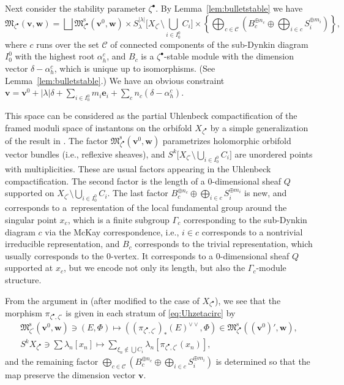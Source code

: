 \documentclass[pdftex]{sigma}
\theoremstyle{definition}
\numberwithin{equation}{section}
\newcommand{\lemref}[1]{Lemma~\ref{#1}}
\newcommand{\M}{{\mathfrak M}} %
\newcommand{\Mreg}{\M^{\operatorname{s}}}
\newcommand{\bv}{{\mathbf v}} %
\newcommand{\bw}{{\mathbf w}} %
\newcommand{\be}{{\mathbf e}}
\begin{document}
Next consider the stability parameter $\zeta^\bullet$. By \lemref{lem:bulletstable} we have
\begin{equation}\label{eq:Uhbullet}
  \M_{\zeta^\bullet}(\bv,\bw)
= \bigsqcup \Mreg_{\zeta^\bullet}(\bv^0,\bw)
  \times S^{|\lambda|}_\lambda
  \Big[X_{\zeta^\circ}\setminus \bigcup_{i\in I_0^0} C_i \Big]
  \times \left\{
    \bigoplus_{c\in\mathcal C} \left(
      B_c^{\oplus n_c} \oplus
    \bigoplus_{i\in c}  S_i^{\oplus m_i} \right)
    \right\},
\end{equation}
where $c$ runs over the set $\mathcal C$ of connected components of
the sub-Dynkin diagram $I_0^0$ with the highest root $\alpha^c_h$, and
$B_c$ is a $\zeta^\bullet$-stable module with the dimension vector
$\delta - \alpha^c_h$, which is unique up to isomorphisms.
(See \lemref{lem:bulletstable}.)
We have an obvious constraint
\(
   \bv = \bv^0 + |\lambda| \delta + \sum_{i\in I_0^0} m_i \be_i
   + \sum_c n_c (\delta - \alpha^c_h).
\)

This space can be considered as the partial Uhlenbeck compactif\/ication
of the framed moduli space of instantons on the orbifold
$X_{\zeta^\bullet}$ by a simple generalization of the result in
\cite{KN}. The factor $\Mreg_{\zeta^\bullet}(\bv^0,\bw)$ parametrizes
holomorphic orbifold vector bundles (i.e., ref\/lexive sheaves), and
$S^k \big[X_{\zeta^\circ}\setminus \bigcup_{i\in I_0^0} C_i\big]$ are
unordered points with multiplicities. These are usual factors
appearing in the Uhlenbeck compactif\/ication. The second factor is the
length of a $0$-dimensional sheaf $Q$ supported on
$X_{\zeta^\circ}\setminus \bigcup_{i\in I_0^0} C_i$.
%
The last factor
\(
    B_c^{\oplus n_c} \oplus
    \bigoplus_{i\in c}  S_i^{\oplus m_i}
\)
is new, and corresponds to a~representation of the local fundamental
group around the singular point $x_c$, which is a f\/inite subgroup
$\Gamma_c$ corresponding to the sub-Dynkin diagram $c$ via the McKay
correspondence,
%
i.e., $i\in c$ corresponds to a nontrivial irreducible representation,
and $B_c$ corresponds to the trivial representation, which usually
corresponds to the $0$-vertex.
%
It corresponds to a $0$-dimensional sheaf $Q$
supported at $x_c$, but we encode not only its length, but also the
$\Gamma_c$-module structure.

From the argument in \cite{Na-ADHM} (after modif\/ied to the case of
$X_{\zeta^\bullet}$), we see that the morphism
$\pi_{\zeta^\bullet,\zeta^\circ}$ is given in each stratum of
\eqref{eq:Uhzetacirc} by
\begin{gather*}
  \Mreg_{\zeta^\circ}(\bv^0,\bw)\ni
   (E,\Phi) \mapsto
   ((\pi_{\zeta^\bullet,\zeta^\circ})_*(E)^{\vee\vee},\Phi)
   \in\Mreg_{\zeta^\bullet}((\bv^0)',\bw),
\\
 S^k X_{\zeta^\bullet} \ni \sum \lambda_n [x_n]
   \mapsto
   \sum_{\xi_n\notin \bigcup C_i} \lambda_n [\pi_{\zeta^\bullet,\zeta^\circ}(x_n)],
\end{gather*}
and the remaining factor $\bigoplus_{c\in\mathcal C} \left(
      B_c^{\oplus n_c} \oplus
    \bigoplus_{i\in c}  S_i^{\oplus m_i} \right)$ is determined so
that the map preserve the dimension vector $\bv$.
\end{document}

